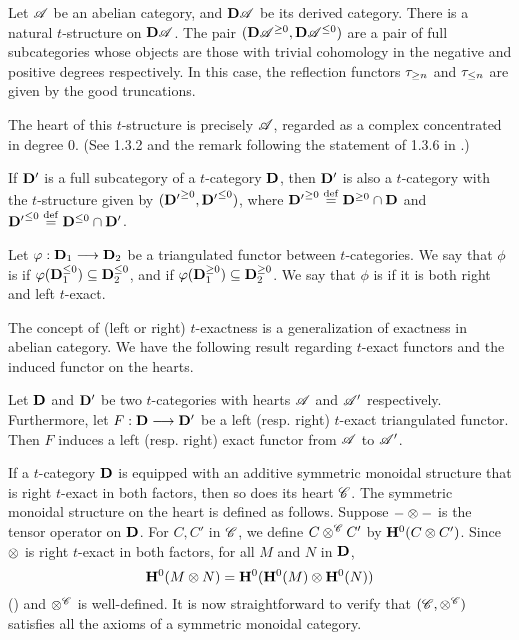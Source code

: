 \begin{ex}\label{ex_DA_t_struct}
Let $\Cat{A}$ be an abelian category, and $\DCat[D]\Cat{A}$ be its
derived category. There is a natural $t$-structure on 
$\DCat[D]\Cat{A}$. The pair $(\DCat[D]\Cat{A}^{\geq 0}, 
\DCat[D]\Cat{A}^{\leq 0})$ are a pair of full subcategories whose
objects are those with trivial cohomology in the negative and 
positive degrees respectively. In this case, the reflection 
functors $\ggtrunc{n}$ and $\gltrunc{n}$ are given by the good
truncations. 

The heart of this $t$-structure is precisely $\Cat{A}$, regarded
as a complex concentrated in degree $0$. (See 1.3.2 and the remark
following the statement of 1.3.6 in \cite{BBD}.)
\end{ex}

\begin{ex}
If $\DCat'$ is a full subcategory of a $t$-category $\DCat$, then
$\DCat'$ is also a $t$-category with the $t$-structure given by
$({\DCat'}^{\geq 0}, {\DCat'}^{\leq 0})$, where ${\DCat'}^{\geq 0} 
\defeq \DCat^{\geq 0} \cap \DCat$ and ${\DCat'}^{\leq 0} \defeq 
\DCat^{\leq 0} \cap \DCat'$. 
\end{ex}

\begin{defn}
Let $\phi: \DCat_1 \to \DCat_2$ be a triangulated functor between
$t$-categories. We say that $\phi$ is  if 
$\phi(\DCat_1^{\leq 0}) \subseteq \DCat_2^{\leq 0}$, and  
 if $\phi(\DCat_1^{\geq 0}) \subseteq 
\DCat_2^{\geq 0}$. We say that $\phi$ is  
if it is both right and left $t$-exact.
\end{defn}

The concept of (left or right) $t$-exactness is a generalization 
of exactness in abelian category. We have the following result
regarding $t$-exact functors and the induced functor on the
hearts.

\begin{prop}\label{prop_t_exact_implies_exact}
Let $\DCat$ and $\DCat'$ be two $t$-categories with hearts 
$\Cat{A}$ and $\Cat{A}'$ respectively. Furthermore, let $F: 
\DCat \to \DCat'$ be a left (resp. right) $t$-exact triangulated 
functor. Then $F$ induces a left (resp. right) exact 
functor from $\Cat{A}$ to $\Cat{A}'$.
\end{prop}

If a $t$-category $\DCat$ is equipped with an additive symmetric 
monoidal structure that is right $t$-exact in both factors, then 
so does its heart $\Cat{C}$. The symmetric monoidal structure on
the heart is defined as follows. Suppose $- \tensor -$ is the 
tensor operator on $\DCat$. For $C, C'$ in $\Cat{C}$, we define $C 
\tensor^{\Cat{C}} C'$ by $\HH^0(C \tensor C')$. 
Since $\tensor$ is right $t$-exact in both factors, for all $M$ 
and $N$ in $\DCat$,
\[
\HH^0(M \tensor N) = \HH^0(\HH^0(M) \tensor \HH^0(N))
\]
(\cite[5.10]{DegModHom}) and $\tensor^{\Cat{C}}$ is well-defined.
It is now straightforward to verify that $(\Cat{C}, 
\tensor^{\Cat{C}})$ satisfies all the axioms of a symmetric 
monoidal category. 


